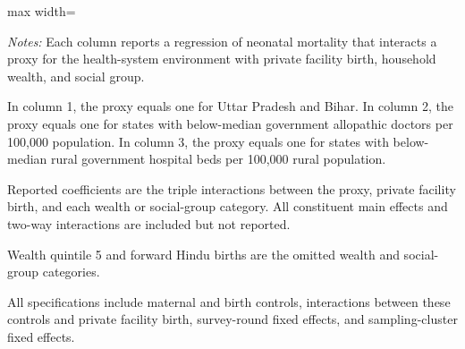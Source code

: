 \documentclass[12pt]{article}
\begin{document}
\begin{landscape}

\renewcommand{\arraystretch}{1.0}
\setlength{\tabcolsep}{11pt}

\begin{table}[H]
    \centering

    \caption{
        : Private--public neonatal mortality disparities are larger in
        selected low-capacity health-system settings
    }
    \label{tab:health_system_capacity}

    \vspace{0.4em}

    \begin{threeparttable}

        \begin{adjustbox}{max width=\textwidth}
            \scriptsize
            
        \end{adjustbox}

        \vspace{0.5em}

        \begin{minipage}{0.92\textwidth}
            \scriptsize
            \textit{Notes:}
            Each column reports a regression of neonatal mortality that
            interacts a proxy for the health-system environment with private
            facility birth, household wealth, and social group.

            In column 1, the proxy equals one for Uttar Pradesh and Bihar.
            In column 2, the proxy equals one for states with below-median
            government allopathic doctors per 100,000 population.
            In column 3, the proxy equals one for states with below-median
            rural government hospital beds per 100,000 rural population.

            Reported coefficients are the triple interactions between the
            proxy, private facility birth, and each wealth or social-group
            category. All constituent main effects and two-way interactions
            are included but not reported.

            Wealth quintile 5 and forward Hindu births are the omitted wealth
            and social-group categories.

            All specifications include maternal and birth controls,
            interactions between these controls and private facility birth,
            survey-round fixed effects, and sampling-cluster fixed effects.


\end{minipage}
\end{threeparttable}
\end{table}
\end{landscape}
\end{document}
